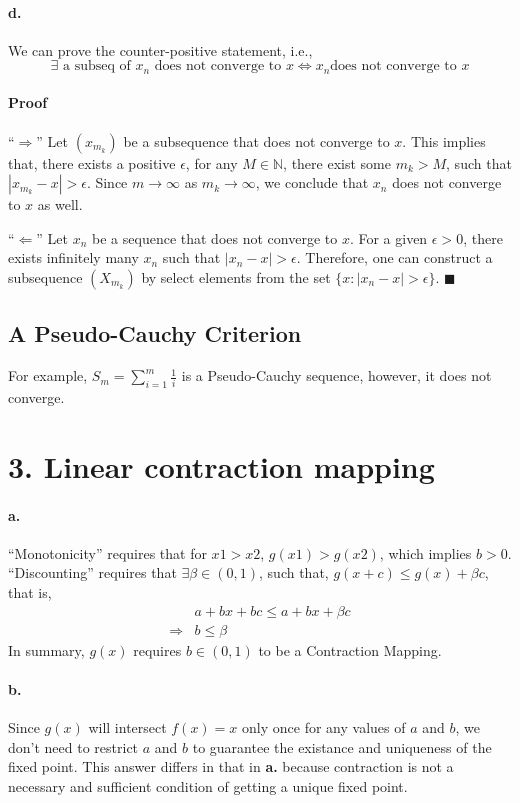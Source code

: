 \documentclass[11pt]{article}
\theoremstyle{definition}
\theoremstyle{boldtitle} %
\numberwithin{equation}{section}
\numberwithin{figure}{section}
\numberwithin{table}{section}
\begin{document}
\paragraph{d.} We can prove the counter-positive statement, i.e., 
\[
\exists \text{ a subseq of } x_n \text{ does not converge to } x \Leftrightarrow x_n \text{does not converge to } x
\]
\paragraph{Proof}
``$\Rightarrow$''
Let $(x_{m_k})$ be a subsequence that does not converge to $x$.
This implies that, there exists a positive $\epsilon$, for any $M \in \mathbb{N}$, there exist some $m_k > M$, 
such that $|x_{m_k} - x| > \epsilon $. 
Since $m \rightarrow \infty$ as $m_k \rightarrow \infty$, we conclude that $x_n$ does not converge to $x$ as well. 

``$\Leftarrow$''
Let $x_n$ be a sequence that does not converge to $x$.
For a given $\epsilon > 0$,
there exists infinitely many $x_n$ such that $|x_n - x| > \epsilon$.
Therefore, one can construct a subsequence $(X_{m_k})$ by select elements from the set $\{x: |x_n - x| > \epsilon \}$.
\(\blacksquare\)



\subsection{A Pseudo-Cauchy Criterion}
For example, $S_m = \sum_{i=1}^m \frac{1}{i}$ is a Pseudo-Cauchy sequence, however, it does not converge.

\section*{3. Linear contraction mapping}
\paragraph{a.} ``Monotonicity'' requires that for $x1 > x2$, $g(x1) > g(x2)$,
which implies $b > 0$.
``Discounting'' requires that $\exists \beta \in (0, 1)$, such that,
$g(x+c) \leq g(x) + \beta c$, that is, 
\begin{align*}
& a + bx + bc \leq a + bx + \beta c \\
\Rightarrow & b \leq \beta
\end{align*}
In summary, $g(x)$ requires $b \in (0,1)$ to be a Contraction Mapping. 

\paragraph{b.} Since $g(x)$ will intersect $f(x) = x$ only once for any values of $a$ and $b$, 
we don't need to restrict $a$ and $b$ to guarantee the existance and uniqueness of the fixed point. 
This answer differs in that in \textbf{a.} because contraction is not a necessary and sufficient condition of getting a unique fixed point. 
\end{document}

